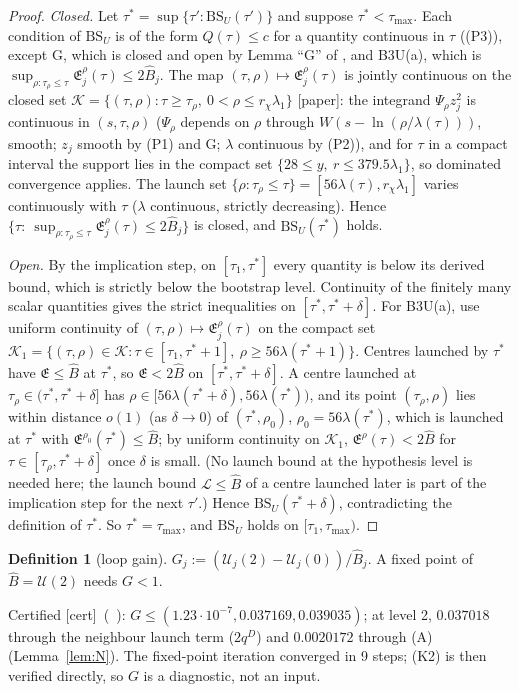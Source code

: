 \documentclass[11pt]{article}
\theoremstyle{definition}\newtheorem{definition}[theorem]{Definition}
\theoremstyle{remark}\newtheorem{remark}[theorem]{Remark}
\newcommand{\fn}[1]{\texttt{\detokenize{#1}}}
\newcommand{\key}[1]{\texttt{\detokenize{#1}}}
\newcommand{\tC}{\textup{[cert]}}\newcommand{\tP}{\textup{[paper]}}\newcommand{\tH}{\textup{[hyp]}}\newcommand{\tE}{\textup{[est]}}
\newcommand{\E}{\mathfrak E}\newcommand{\B}{\mathfrak B}\newcommand{\Bh}{\hat B}\newcommand{\Eh}{\hat E^A}
\begin{document}
\begin{proof}
\emph{Closed.} Let $\tau^*=\sup\{\tau':\mathrm{BS}_U(\tau')\}$ and suppose $\tau^*<\tau_{\max}$. Each condition of $\mathrm{BS}_U$ is of the form $Q(\tau)\le c$ for a quantity continuous in $\tau$ ((P3)), except G, which is closed and open by Lemma ``G'' of \fn{continuation_v33.tex}, and B3U(a), which is $\sup_{\rho:\tau_\rho\le\tau}\E^\rho_j(\tau)\le2\Bh_j$. The map $(\tau,\rho)\mapsto\E^\rho_j(\tau)$ is jointly continuous on the closed set $\mathcal K=\{(\tau,\rho):\tau\ge\tau_\rho,\ 0<\rho\le r_\chi\lambda_1\}$ \tP: the integrand $\Psi_\rho z_j^2$ is continuous in $(s,\tau,\rho)$ ($\Psi_\rho$ depends on $\rho$ through $W(s-\ln(\rho/\lambda(\tau)))$, smooth; $z_j$ smooth by (P1) and G; $\lambda$ continuous by (P2)), and for $\tau$ in a compact interval the support lies in the compact set $\{28\le y,\ r\le379.5\lambda_1\}$, so dominated convergence applies. The launch set $\{\rho:\tau_\rho\le\tau\}=[56\lambda(\tau),r_\chi\lambda_1]$ varies continuously with $\tau$ ($\lambda$ continuous, strictly decreasing). Hence $\{\tau:\ \sup_{\rho:\tau_\rho\le\tau}\E^\rho_j(\tau)\le2\Bh_j\}$ is closed, and $\mathrm{BS}_U(\tau^*)$ holds.

\emph{Open.} By the implication step, on $[\tau_1,\tau^*]$ every quantity is below its derived bound, which is strictly below the bootstrap level. Continuity of the finitely many scalar quantities gives the strict inequalities on $[\tau^*,\tau^*+\delta]$. For B3U(a), use uniform continuity of $(\tau,\rho)\mapsto\E^\rho_j(\tau)$ on the compact set $\mathcal K_1=\{(\tau,\rho)\in\mathcal K:\tau\in[\tau_1,\tau^*+1],\ \rho\ge56\lambda(\tau^*+1)\}$. Centres launched by $\tau^*$ have $\E\le\Bh$ at $\tau^*$, so $\E<2\Bh$ on $[\tau^*,\tau^*+\delta]$. A centre launched at $\tau_\rho\in(\tau^*,\tau^*+\delta]$ has $\rho\in[56\lambda(\tau^*+\delta),56\lambda(\tau^*))$, and its point $(\tau_\rho,\rho)$ lies within distance $o(1)$ (as $\delta\to0$) of $(\tau^*,\rho_0)$, $\rho_0=56\lambda(\tau^*)$, which is launched at $\tau^*$ with $\E^{\rho_0}(\tau^*)\le\Bh$; by uniform continuity on $\mathcal K_1$, $\E^\rho(\tau)<2\Bh$ for $\tau\in[\tau_\rho,\tau^*+\delta]$ once $\delta$ is small. (No launch bound at the hypothesis level is needed here; the launch bound $\mathcal L\le\Bh$ of a centre launched later is part of the implication step for the next $\tau'$.) Hence $\mathrm{BS}_U(\tau^*+\delta)$, contradicting the definition of $\tau^*$. So $\tau^*=\tau_{\max}$, and $\mathrm{BS}_U$ holds on $[\tau_1,\tau_{\max})$.
\end{proof}

\begin{definition}[loop gain]\label{def:gain}
$G_j:=(\mathcal U_j(2)-\mathcal U_j(0))/\Bh_j$. A fixed point of $\Bh=\mathcal U(2)$ needs $G<1$.
\end{definition}
\noindent Certified \tC\ (\SU\ \key{loop_gain}): $G\le(1.23\cdot10^{-7},0.037169,0.039035)$; at level 2, $0.037018$ through the neighbour launch term ($2q^D$) and $0.0020172$ through (A) (Lemma~\ref{lem:N}). The fixed-point iteration converged in 9 steps; (K2) is then verified directly, so $G$ is a diagnostic, not an input.
\end{document}

